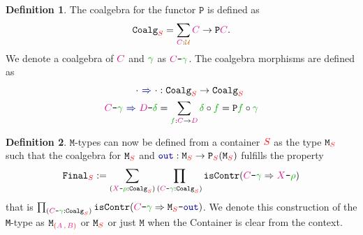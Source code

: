 \documentclass[twoside,11pt,openright]{report}
\theoremstyle{plain} %
\theoremstyle{definition}
\newtheorem{defn}{Definition}[section]
\theoremstyle{remark}
\newcommand*{\term}[1]{\textcolor{green!70!black}{#1}} %
\newcommand*{\type}[1]{\textcolor{magenta!90!black}{#1}}
\newcommand*{\container}[1]{\textcolor{red}{#1}}
\newcommand*{\containerpair}[2]{\textcolor{red}{(}#1\,\textcolor{red}{,}\,#2\textcolor{red}{)}}
\newcommand*{\universe}[1]{\textcolor{orange!80!black}{#1}}
\newcommand*{\coalg}[2]{#1\texttt{-}#2}
\newcommand*{\function}[1]{\textcolor{blue!60!black}{\ensuremath{\mathtt{#1}}}}
\newcommand*{\typeformer}[1]{\ensuremath{\mathtt{#1}}}
\newcommand*{\functor}[1]{\ensuremath{\mathbf{\mathtt{#1}}}}
\begin{document}
\begin{defn}
  The coalgebra for the functor \functor{P} is defined as
  \begin{equation}
    \typeformer{Coalg}_{\container{S}} = \sum_{\type{C} : \universe{\mathcal{U}}} \type{C} \rightarrow \functor{P}\type{C}.
  \end{equation}
  We denote a coalgebra of \(\type{C}\) and \(\term{\gamma}\) as \(\coalg{\type{C}}{\term{\gamma}}\). The coalgebra morphisms are defined as
  \begin{equation}
    \begin{aligned}
      \cdot~\function{\Rightarrow}~\cdot &: \typeformer{Coalg}_{\container{S}} \rightarrow \typeformer{Coalg}_{\container{S}} \\
      \coalg{\type{C}}{\term{\gamma}}~\function{\Rightarrow}~\coalg{\type{D}}{\term{\delta}} &= \sum_{\term{f} : \type{C} \rightarrow \type{D}} \term{\delta} \circ \term{f} = \functor{P} \term{f} \circ \term{\gamma}
    \end{aligned}
  \end{equation}
\end{defn}
\begin{defn}
  \(\mathtt{M}\)-types can now be defined from a container \(\container{S}\) as the type \(\typeformer{M}_{\container{S}}\) such that the coalgebra for \(\typeformer{M}_{\container{S}}\) and \(\function{out} : \typeformer{M}_{\container{S}} \rightarrow \functor{P}_{\container{S}}(\typeformer{M}_{\container{S}})\) fulfills the property
  \begin{equation}
    \typeformer{Final}_{\container{S}} := \sum_{(\coalg{\type{X}}{\term{\rho}} : \mathtt{Coalg}_{\container{S}})} \prod_{(\coalg{\type{C}}{\term{\term{\gamma}}} : \mathtt{Coalg}_{\container{S}})} \mathtt{isContr}(\coalg{\type{C}}{\term{\gamma}} \Rightarrow \coalg{\type{X}}{\term{\rho}})
  \end{equation}
  that is \(\prod_{(\coalg{\type{C}}{\term{\gamma}} : \mathtt{Coalg}_{\container{S}})} \mathtt{isContr}(\coalg{\type{C}}{\term{\gamma}} \Rightarrow \coalg{\typeformer{M}_{\container{S}}}{\function{out}})\). We denote this construction of the \texttt{M}-type as \(\typeformer{M}_{\containerpair{\type{A}}{\type{B}}}\) or \(\typeformer{M}_{\container{S}}\) or just \(\typeformer{M}\) when the Container is clear from the context.
\end{defn}
\end{document}
